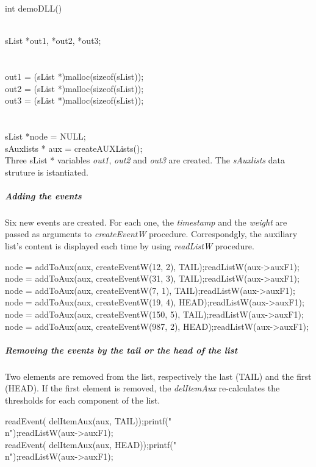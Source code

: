 int demoDLL()\\
{\\
	sList *out1, *out2, *out3;\\\\\\


	out1 = (sList *)malloc(sizeof(sList));\\
	out2 = (sList *)malloc(sizeof(sList));\\
	out3 = (sList *)malloc(sizeof(sList));\\
\\
\\
	sList *node = NULL;\\
	sAuxlists * aux = createAUXLists();\\
 Three sList * variables \textit{out1}, \textit{out2} and \textit{out3} are created. The \textit{sAuxlists} data struture is istantiated.

\subparagraph{Adding the events}
Six new events are created. For each one, the \textit{timestamp} and the \textit{weight} are passed as arguments to \textit{createEventW} procedure. Correspondgly, the auxiliary list's content is displayed each time by 
using \textit{readListW} procedure.

	node = addToAux(aux, createEventW(12, 2), TAIL);readListW(aux->auxF1);\\
	node = addToAux(aux, createEventW(31, 3), TAIL);readListW(aux->auxF1);\\
	node = addToAux(aux, createEventW(7, 1), TAIL);readListW(aux->auxF1);\\
	node = addToAux(aux, createEventW(19, 4), HEAD);readListW(aux->auxF1);\\
	node = addToAux(aux, createEventW(150, 5), TAIL);readListW(aux->auxF1);\\
	node = addToAux(aux, createEventW(987, 2), HEAD);readListW(aux->auxF1);\\
	
\subparagraph{Removing the events by the tail or the head of the list}
Two elements are removed from the list, respectively the last (TAIL) and the first (HEAD). If the first element is removed, the \textit{delItemAux} re-calculates the thresholds for 
each component of the list.

	readEvent( delItemAux(aux, TAIL));printf("\\n");readListW(aux->auxF1);\\
	readEvent( delItemAux(aux, HEAD));printf("\\n");readListW(aux->auxF1);\\

}
